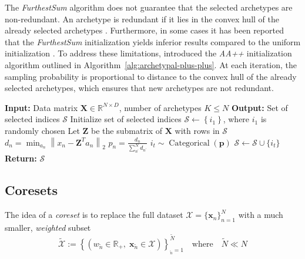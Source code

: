 \documentclass{article}
\begin{document}
The \textit{FurthestSum} algorithm does not guarantee that the selected archetypes are non-redundant. An archetype is redundant if it lies in the convex hull of the already selected archetypes \autocite{sulemanIllconceivedInitializationArchetypal2017}. Furthermore, in some cases it has been reported that the \textit{FurthestSum} initialization yields inferior results compared to the uniform initialization \autocite{krohneClassificationSocialAnhedonia2019, olsenCombiningElectroMagnetoencephalography2022}. To address these limitations, \textcite{mairArchetypalAnalysisRethinking2024} introduced the \textit{AA++} initialization algorithm outlined in Algorithm~\ref{alg:archetypal-plus-plus}. At each iteration, the sampling probability is proportional to distance to the convex hull of the already selected archetypes, which ensures that new archetypes are not redundant.

\begin{algorithm}[H]
    \caption{Archetypal++ Initialization}
    \label{alg:archetypal-plus-plus}
    \begin{algorithmic}[1]
    \State \textbf{Input:} Data matrix $\mathbf{X} \in \mathbb{R}^{N \times D}$, number of archetypes $K \leq N$
    \State \textbf{Output:} Set of selected indices $\mathcal{S}$
    \State Initialize set of selected indices $\mathcal{S} \gets \left\{ i_1 \right\}$, where $i_1$ is randomly chosen
        \State Let $\mathbf{Z}$ be the submatrix of $\mathbf{X}$ with rows in $\mathcal{S}$
        \State $d_n = \min_{a_n} \left\| x_n - \mathbf{Z}^T a_n \right\|_2$ 
        \EndFor
            \State $p_n = \frac{d_n}{\sum_{n^\prime}^N d_{n^\prime}}$ 
        \EndFor
        \State $i_t \sim \operatorname{Categorical}(\mathbf{p})$ 
        \State $\mathcal S \gets \mathcal S \cup \{i_t\}$ 
    \EndFor
    \State \textbf{Return:} $\mathcal{S}$
    \end{algorithmic}
\end{algorithm}

\subsection{Coresets}
\label{subsec:coresets}

The idea of a \emph{coreset} is to replace the full dataset
$\mathcal{X}=\{\mathbf{x}_n\}_{n=1}^{N}$ with a much smaller, \emph{weighted} subset
\begin{equation}
    \tilde{\mathcal{X}} := \left\{(w_{\tilde{n}} \in \mathbb{R}_+, \; \mathbf{x}_{\tilde{n}} \in \mathcal{X}) \right\}_{_{\tilde{n}}=1}^{\tilde{N}} \quad \text{where} \quad \tilde{N} \ll N
\end{equation}
\end{document}
